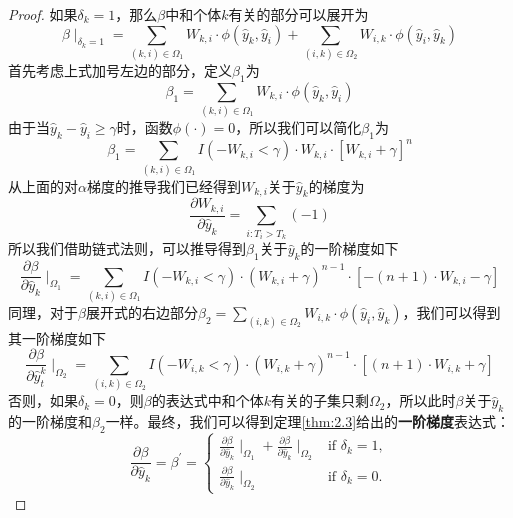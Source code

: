 \begin{proof}
如果$\delta_k = 1$，那么$\beta$中和个体$k$有关的部分可以展开为$$\beta \mid_{\delta_k=1}=\sum_{(k,i)\in \Omega_1} W_{k,i}\cdot \phi(\hat{y}_k, \hat{y}_i) + \sum_{(i,k)\in \Omega_2} W_{i,k}\cdot \phi(\hat{y}_i, \hat{y}_k) $$ 首先考虑上式加号左边的部分，定义$\beta_1$为$$\beta_1 = \sum_{(k,i)\in \Omega_1} W_{k,i}\cdot \phi(\hat{y}_k, \hat{y}_i)$$ 由于当$\hat{y}_k - \hat{y}_i \ge \gamma$时，函数$\phi(\cdot)=0$，所以我们可以简化$\beta_1$为$$\beta_1 = \sum_{(k,i)\in \Omega_1} I(-W_{k,i} < \gamma) \cdot W_{k,i}\cdot [W_{k,i} + \gamma]^n $$ 从上面的对$\alpha$梯度的推导我们已经得到$W_{k,i}$关于$\hat{y}_k$的梯度为$$\frac{\partial W_{k,i}}{\partial \hat{y}_k} = \sum\limits_{i: T_i>T_k}(-1)$$ 所以我们借助链式法则，可以推导得到$\beta_1$关于$\hat{y}_k$的一阶梯度如下$$
\frac{\partial \beta}{\partial \hat{y}_k} \mid_{\Omega_1} = \sum\limits_{(k,i)\in \Omega_1} {I(-W_{k,i}<\gamma)\cdot (W_{k,i}+\gamma)^{n-1}\cdot [-(n+1)\cdot W_{k,i}-\gamma]}
$$ 同理，对于$\beta$展开式的右边部分$\beta_2=\sum_{(i,k)\in \Omega_2} W_{i,k}\cdot \phi(\hat{y}_i, \hat{y}_k)$，我们可以得到其一阶梯度如下$$
\frac{\partial \beta}{\partial \hat{y}_t^k} \mid_{\Omega_2} = \sum\limits_{(i,k)\in \Omega_2} {I(-W_{i,k}<\gamma)\cdot (W_{i,k}+\gamma)^{n-1}\cdot [(n+1)\cdot W_{i,k}+\gamma]}
$$ 否则，如果$\delta_k = 0$，则$\beta$的表达式中和个体$k$有关的子集只剩$\Omega_2$，所以此时$\beta$关于$\hat{y}_k$的一阶梯度和$\beta_2$一样。最终，我们可以得到定理\ref{thm:2.3}给出的\textbf{一阶梯度}表达式：$$
\frac{\partial \beta}{\partial \hat{y}_k}=\beta^{'}=
\begin{cases}
\frac{\partial \beta}{\partial \hat{y}_k} \mid_{\Omega_1} + \frac{\partial \beta}{\partial \hat{y}_k} \mid_{\Omega_2} & \text{if } \delta_k = 1,\\
\frac{\partial \beta}{\partial \hat{y}_k} \mid_{\Omega_2} & \text{if } \delta_k = 0.
\end{cases}
$$


\end{proof}
